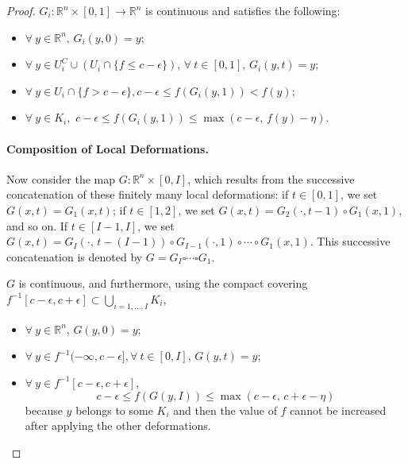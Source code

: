 \documentclass[11pt]{article}
\newcommand{\R}{\mathbb{R}}
\newcommand{\eps}{\epsilon}
\newcommand{\inter}{\cap}
\newcommand{\union}{\cup}
\theoremstyle{plain}
\theoremstyle{definition}
\theoremstyle{remark}
\begin{document}
\begin{proof}
	$G_i : \R^n \times [0,1] \to \R^n$ is continuous and satisfies the following:
	\begin{itemize}
		\item $\forall\ y \in \R^n,\, G_i(y,0) = y$;
		\item $\forall\ y \in U_i^C \union (U_i \inter \{f \leq c - \eps\}),\, \forall\ t \in [0,1],\, G_i(y,t) = y$;
		\item $\forall\ y \in U_i \inter \{f > c - \eps\}, c -\eps \leq f( G_i(y,1) ) < f(y)$;
		\item $\forall\ y \in K_i$,\,  
		$ c-\eps \leq f(G_i(y,1)) \leq \max(c - \eps,\, f(y) - \eta)$.
	\end{itemize}
	
\paragraph{Composition of Local Deformations.}
	Now consider the map $G : \R^n \times [0,I] $, which 
	results from the successive concatenation of these finitely many local deformations: if $t \in [0,1]$, we set $G(x,t) = G_1(x,t)$; if $t \in [1,2]$, we set $G(x,t) = G_2(\cdot, t - 1) \circ G_1(x,1)$, and so on.  If $t \in [I-1, I]$, we set $G(x,t) = G_{I}(\cdot,\, t - (I-1)) \circ G_{I-1}(\cdot, 1) \circ \cdots \circ G_1(x, 1)$. 
	This successive concatenation is denoted by $G = G_{I} \square \cdots \square G_1$.
	
	$G$ is continuous, and furthermore, using the compact covering $f^{-1}[c-\eps, c+\eps] \subset \bigcup\limits_{i = 1, \ldots, I} K_i$,
	\begin{itemize}
		\item $\forall\ y \in \R^n$, $G(y, 0) = y$;
		\item $\forall\ y \in f^{-1}(-\infty, c-\eps], \forall\ t \in [0, I]$, $G(y, t) = y$;
		\item $\forall\ y \in f^{-1}[c-\eps, c+\eps]$, 
		\[c - \eps \leq f(G(y,I)) \leq \max(c-\eps,\, c + \eps - \eta)\] because $y$ belongs to some $K_i$ and then the value of $f$ cannot be increased after applying the other deformations.
	\end{itemize}
	

\end{proof}
\end{document}

